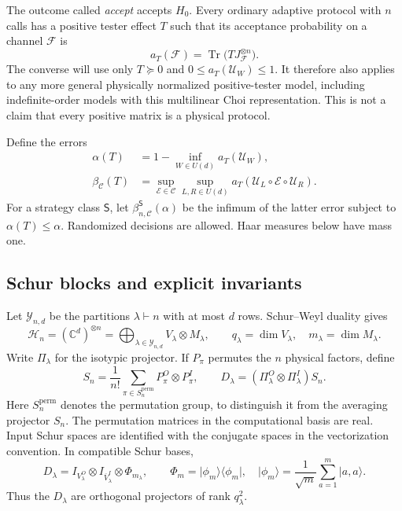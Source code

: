 \documentclass[11pt,a4paper]{article}
\theoremstyle{remark}\newtheorem{remark}[theorem]{Remark}
\DeclareMathOperator{\Tr}{Tr}
\newcommand{\cE}{\mathcal E}
\newcommand{\cF}{\mathcal F}
\newcommand{\cU}{\mathcal U}
\newcommand{\cC}{\mathcal C}
\newcommand{\cH}{\mathcal H}
\newcommand{\cY}{\mathcal Y_{n,d}}
\newcommand{\ket}[1]{\lvert #1\rangle}
\newcommand{\bra}[1]{\langle #1\rvert}
\newcommand{\bbC}{\mathbb C}
\begin{document}
The outcome called \emph{accept} accepts $H_0$. Every ordinary adaptive protocol with $n$ calls has a positive tester effect $T$ such that its acceptance probability on a channel $\cF$ is
\begin{equation}
 a_T(\cF)=\Tr\bigl(TJ_{\cF}^{\otimes n}\bigr).
\end{equation}
The converse will use only $T\succeq0$ and $0\leq a_T(\cU_W)\leq1$. It therefore also applies to any more general physically normalized positive-tester model, including indefinite-order models with this multilinear Choi representation. This is not a claim that every positive matrix is a physical protocol.

Define the errors
\begin{align}
 \alpha(T)&=1-\inf_{W\in U(d)}a_T(\cU_W),\\
 \beta_{\cC}(T)&=\sup_{\cE\in\cC}\sup_{L,R\in U(d)}
 a_T(\cU_L\circ\cE\circ\cU_R).
\end{align}
For a strategy class $\mathsf S$, let $\beta^{\mathsf S}_{n,\cC}(\alpha)$ be the infimum of the latter error subject to $\alpha(T)\leq\alpha$. Randomized decisions are allowed. Haar measures below have mass one.

\subsection{Schur blocks and explicit invariants}
Let $\cY$ be the partitions $\lambda\vdash n$ with at most $d$ rows. Schur--Weyl duality gives
\begin{equation}\label{eq:schur}
 \cH_n=(\bbC^d)^{\otimes n}
 =\bigoplus_{\lambda\in\cY} V_\lambda\otimes M_\lambda,
 \qquad q_\lambda=\dim V_\lambda,\quad m_\lambda=\dim M_\lambda.
\end{equation}
Write $\Pi_\lambda$ for the isotypic projector. If $P_\pi$ permutes the $n$ physical factors, define
\begin{equation}\label{eq:D}
 S_n=\frac1{n!}\sum_{\pi\in S_n^{\mathrm{perm}}}P_\pi^O\otimes P_\pi^I,
 \qquad D_\lambda=(\Pi_\lambda^O\otimes\Pi_\lambda^I)S_n.
\end{equation}
Here $S_n^{\mathrm{perm}}$ denotes the permutation group, to distinguish it from the averaging projector $S_n$. The permutation matrices in the computational basis are real. Input Schur spaces are identified with the conjugate spaces in the vectorization convention. In compatible Schur bases,
\begin{equation}\label{eq:Dblock}
 D_\lambda=I_{V_\lambda^O}\otimes I_{\overline V_\lambda^I}
 \otimes\Phi_{m_\lambda},\qquad
 \Phi_m=\ket{\phi_m}\bra{\phi_m},\quad
 \ket{\phi_m}=\frac1{\sqrt m}\sum_{a=1}^m\ket{a,a}.
\end{equation}
Thus the $D_\lambda$ are orthogonal projectors of rank $q_\lambda^2$.
\end{document}
